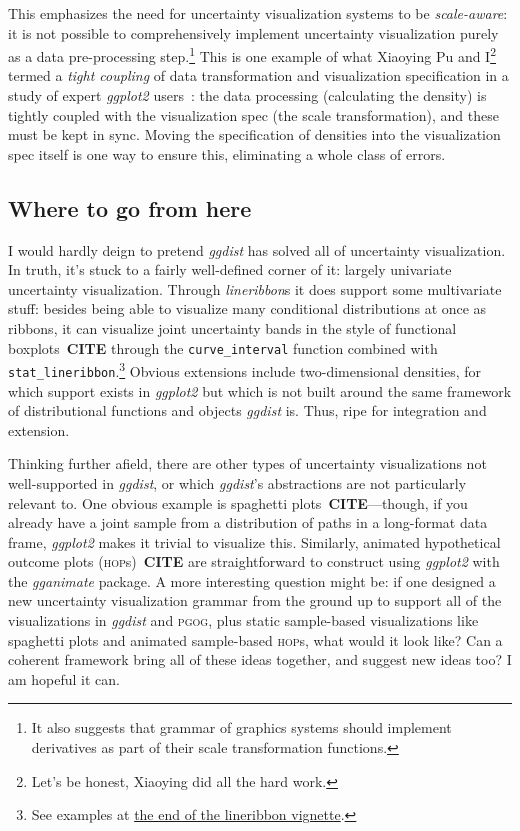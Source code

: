 \documentclass[journal]{vgtc}                     %
\begin{document}
This emphasizes the need for uncertainty visualization systems to be \textit{scale-aware}: it is not possible to comprehensively implement uncertainty visualization purely as a data pre-processing step.\footnote{It also suggests that grammar of graphics systems should implement derivatives as part of their scale transformation functions.} This is one example of what Xiaoying Pu and I\footnote{Let's be honest, Xiaoying did all the hard work.} termed a \textit{tight coupling} of data transformation and visualization specification in a study of expert \textit{ggplot2} users~\cite{pu2023inpractice}: the data processing (calculating the density) is tightly coupled with the visualization spec (the scale transformation), and these must be kept in sync. Moving the specification of densities into the visualization spec itself is one way to ensure this, eliminating a whole class of errors. 


\subsection{Where to go from here}

I would hardly deign to pretend \textit{ggdist} has solved all of uncertainty visualization. In truth, it's stuck to a fairly well-defined corner of it: largely univariate uncertainty visualization. Through \textit{lineribbon}s it does support some multivariate stuff: besides being able to visualize many conditional distributions at once as ribbons, it can visualize joint uncertainty bands in the style of functional boxplots~\textbf{CITE} through the \texttt{curve\_interval} function combined with \texttt{stat\_lineribbon}.\footnote{See examples at \href{https://mjskay.github.io/ggdist/articles/lineribbon.html\#curve-boxplots-aka-lineribbons-with-joint-intervals-or-curvewise-intervals}{the end of the lineribbon vignette}.} Obvious extensions include two-dimensional densities, for which support exists in \textit{ggplot2} but which is not built around the same framework of distributional functions and objects \textit{ggdist} is. Thus, ripe for integration and extension.

Thinking further afield, there are other types of uncertainty visualizations not well-supported in \textit{ggdist}, or which \textit{ggdist}'s abstractions are not particularly relevant to. One obvious example is spaghetti plots~\textbf{CITE}---though, if you already have a joint sample from a distribution of paths in a long-format data frame, \textit{ggplot2} makes it trivial to visualize this. Similarly, animated hypothetical outcome plots (\textsc{hop}s)~\textbf{CITE} are straightforward to construct using \textit{ggplot2} with the \textit{gganimate} package. A more interesting question might be: if one designed a new uncertainty visualization grammar from the ground up to support all of the  visualizations in \textit{ggdist} and \textsc{pgog}, plus static sample-based visualizations like spaghetti plots and animated sample-based \textsc{hop}s, what would it look like? Can a coherent framework bring all of these ideas together, and suggest new ideas too? I am hopeful it can.
\end{document}
